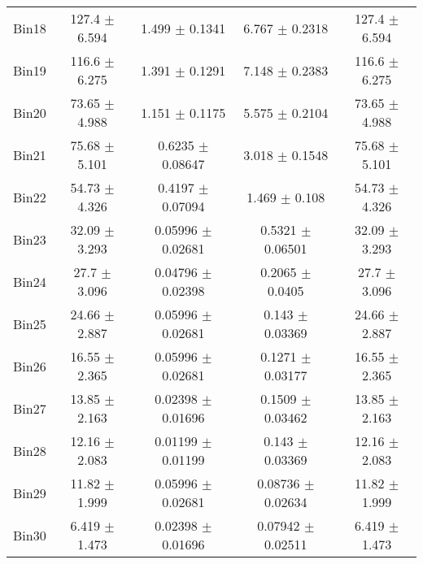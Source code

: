 \begin{tabular}{@{\extracolsep{4pt}}lcccc@{}}
     Bin18 & 127.4 $\pm$ 6.594 & 1.499 $\pm$ 0.1341 & 6.767 $\pm$ 0.2318 & 127.4 $\pm$ 6.594 \\ 
     Bin19 & 116.6 $\pm$ 6.275 & 1.391 $\pm$ 0.1291 & 7.148 $\pm$ 0.2383 & 116.6 $\pm$ 6.275 \\ 
     Bin20 & 73.65 $\pm$ 4.988 & 1.151 $\pm$ 0.1175 & 5.575 $\pm$ 0.2104 & 73.65 $\pm$ 4.988 \\ 
     Bin21 & 75.68 $\pm$ 5.101 & 0.6235 $\pm$ 0.08647 & 3.018 $\pm$ 0.1548 & 75.68 $\pm$ 5.101 \\ 
     Bin22 & 54.73 $\pm$ 4.326 & 0.4197 $\pm$ 0.07094 & 1.469 $\pm$ 0.108 & 54.73 $\pm$ 4.326 \\ 
     Bin23 & 32.09 $\pm$ 3.293 & 0.05996 $\pm$ 0.02681 & 0.5321 $\pm$ 0.06501 & 32.09 $\pm$ 3.293 \\ 
     Bin24 & 27.7 $\pm$ 3.096 & 0.04796 $\pm$ 0.02398 & 0.2065 $\pm$ 0.0405 & 27.7 $\pm$ 3.096 \\ 
     Bin25 & 24.66 $\pm$ 2.887 & 0.05996 $\pm$ 0.02681 & 0.143 $\pm$ 0.03369 & 24.66 $\pm$ 2.887 \\ 
     Bin26 & 16.55 $\pm$ 2.365 & 0.05996 $\pm$ 0.02681 & 0.1271 $\pm$ 0.03177 & 16.55 $\pm$ 2.365 \\ 
     Bin27 & 13.85 $\pm$ 2.163 & 0.02398 $\pm$ 0.01696 & 0.1509 $\pm$ 0.03462 & 13.85 $\pm$ 2.163 \\ 
     Bin28 & 12.16 $\pm$ 2.083 & 0.01199 $\pm$ 0.01199 & 0.143 $\pm$ 0.03369 & 12.16 $\pm$ 2.083 \\ 
     Bin29 & 11.82 $\pm$ 1.999 & 0.05996 $\pm$ 0.02681 & 0.08736 $\pm$ 0.02634 & 11.82 $\pm$ 1.999 \\ 
     Bin30 & 6.419 $\pm$ 1.473 & 0.02398 $\pm$ 0.01696 & 0.07942 $\pm$ 0.02511 & 6.419 $\pm$ 1.473 \\ 
\hline\hline
  \end{tabular}
